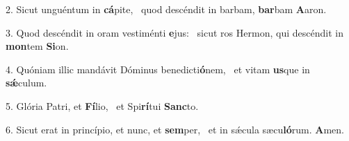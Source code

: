 2. Sicut unguéntum in \textbf{cá}pite, \ast\  quod descéndit in barbam, \textbf{bar}bam \textbf{A}aron.\

3. Quod descéndit in oram vestiménti \textbf{e}jus: \ast\  sicut ros Hermon, qui descéndit in \textbf{mon}tem \textbf{Si}on.\

4. Quóniam illic mandávit Dóminus benedicti\textbf{ó}nem, \ast\  et vitam \textbf{us}que in \textbf{sǽ}culum.\

5. Glória Patri, et \textbf{Fí}lio, \ast\  et Spi\textbf{rí}tui \textbf{Sanc}to.\

6. Sicut erat in princípio, et nunc, et \textbf{sem}per, \ast\  et in sǽcula sæcu\textbf{ló}rum. \textbf{A}men.\

